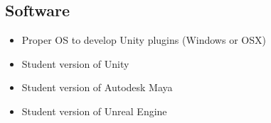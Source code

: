 \subsection{Software}
\begin{itemize}
 \item Proper OS to develop Unity plugins (Windows or OSX)
 \item Student version of Unity
 \item Student version of Autodesk Maya
 \item Student version of Unreal Engine
\end{itemize}

